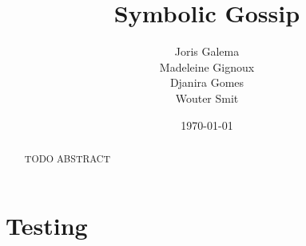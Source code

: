 \documentclass[12pt,a4paper]{article}
\title{Symbolic Gossip}
\author{Joris Galema \\ Madeleine Gignoux \\ Djanira Gomes \\ Wouter Smit}
\date{\today}
\begin{document}
\maketitle

\begin{abstract}
TODO ABSTRACT 
\end{abstract}

\vfill

\tableofcontents

\clearpage



\section{Testing}





\end{document}
